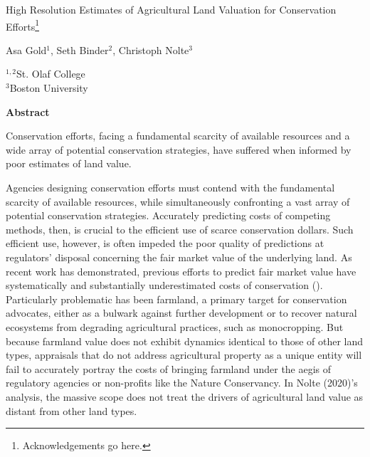 \documentclass[12pt]{article}
\begin{document}
\hspace{5pt}

\Large
 \begin{center}
High Resolution Estimates of Agricultural Land Valuation for Conservation Efforts\footnote[2]{Acknowledgements go here.}\\ 

\vspace{10pt}

\large
Asa Gold$^1$, Seth Binder$^2$, Christoph Nolte$^3$ \\

\vspace{10pt}

\footnotesize  
$^{1,2}$St. Olaf College\\
$^3$Boston University

\vspace{40pt} 

    \normalsize
    \textbf{Abstract}
\end{center}

\small
Conservation efforts, facing a fundamental scarcity of available resources and a wide array of potential conservation strategies, have suffered when informed by poor estimates of land value.

\newpage

Agencies designing conservation efforts must contend with the fundamental scarcity of available resources, while simultaneously confronting a vast array of potential conservation strategies. Accurately predicting costs of competing methods, then, is crucial to the efficient use of scarce conservation dollars. Such efficient use, however, is often impeded the poor quality of predictions at regulators' disposal concerning the fair market value of the underlying land. As recent work has demonstrated, previous efforts to predict fair market value have systematically and substantially underestimated costs of conservation (\cite{Nolte2020High-resolutionStates}). Particularly problematic has been farmland, a primary target for conservation advocates, either as a bulwark against further development or to recover natural ecosystems from degrading agricultural practices, such as monocropping. But because farmland value does not exhibit dynamics identical to those of other land types, appraisals that do not address agricultural property as a unique entity will fail to accurately portray the costs of bringing farmland under the aegis of regulatory agencies or non-profits like the Nature Conservancy. In Nolte (2020)'s analysis, the massive scope does not treat the drivers of agricultural land value as distant from other land types.
\end{document}
